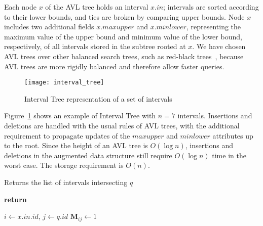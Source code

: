 \documentclass[10pt, conference, compsocconf]{IEEEtran}
\begin{document}
Each node $x$ of the AVL tree holds an interval $x.\textit{in}$;
intervals are sorted according to their lower bounds, and ties are
broken by comparing upper bounds. Node $x$ includes two additional
fields $x.\textit{maxupper}$ and $x.\textit{minlower}$, representing
the maximum value of the upper bound and minimum value of the lower
bound, respectively, of all intervals stored in the subtree rooted at
$x$. We have chosen AVL trees over other balanced search trees, such
as red-black trees~\cite{rbtree}, because AVL trees are more rigidly
balanced and therefore allow faster queries.

\begin{figure}[t]
\centering\texttt{[image: interval\_tree]}
\caption{Interval Tree representation of a set of intervals}\label{fig:interval_tree}
\end{figure}

Figure~\ref{fig:interval_tree} shows an example of Interval Tree with
$n=7$ intervals. Insertions and deletions are handled with the usual
rules of AVL trees, with the additional requirement to propagate
updates of the $\textit{maxupper}$ and $\textit{minlower}$ attributes
up to the root. Since the height of an AVL tree is $O(\log n)$,
insertions and deletions in the augmented data structure still require
$O(\log n)$ time in the worst case. The storage requirement is $O(n)$.

\begin{algorithm}[t]
\caption{Returns the list of intervals intersecting $q$}\label{alg:query}
\begin{algorithmic}

\State \textbf{return}
\EndIf

\State {}

\State $i \gets x.\textit{in}.\textit{id}$, $j \gets q.\textit{id}$
\State $\mathbf{M}_{ij} \gets 1$
\EndIf

\State {}
\EndIf

\EndFunction
\end{algorithmic}
\end{algorithm}
\end{document}
